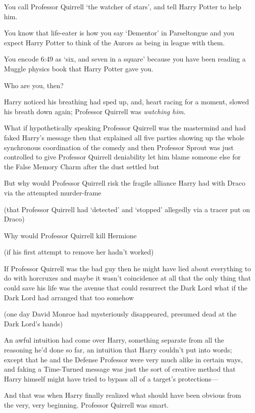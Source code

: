 You call Professor Quirrell `the watcher of stars', and tell Harry Potter to help him.

You know that life-eater is how you say `Dementor' in Parseltongue and you expect Harry Potter to think of the Aurors as being in league with them.

You encode 6:49 as `six, and seven in a square' because you have been reading a Muggle physics book that Harry Potter gave you.

Who are you, then?

Harry noticed his breathing had sped up, and, heart racing for a moment, slowed his breath down again; Professor Quirrell was \emph{watching him}.

What if hypothetically speaking Professor Quirrell was the mastermind and had faked Harry's message then that explained all five parties showing up the whole synchronous coordination of the comedy and then Professor Sprout was just controlled to give Professor Quirrell deniability let him blame someone else for the False Memory Charm after the dust settled but

But why would Professor Quirrell risk the fragile alliance Harry had with Draco via the attempted murder-frame

(that Professor Quirrell had `detected' and `stopped' allegedly via a tracer put on Draco)

Why would Professor Quirrell kill Hermione

(if his first attempt to remove her hadn't worked)

If Professor Quirrell was the bad guy then he might have lied about everything to do with horcruxes and maybe it wasn't coincidence at all that the only thing that could save his life was the avenue that could resurrect the Dark Lord what if the Dark Lord had arranged that too somehow

(one day David Monroe had mysteriously disappeared, presumed dead at the Dark Lord's hands)

An awful intuition had come over Harry, something separate from all the reasoning he'd done so far, an intuition that Harry couldn't put into words; except that he and the Defense Professor were very much alike in certain ways, and faking a Time-Turned message was just the sort of creative method that Harry himself might have tried to bypass all of a target's protections—

And that was when Harry finally realized what should have been obvious from the very, very beginning. \later Professor Quirrell was smart.

